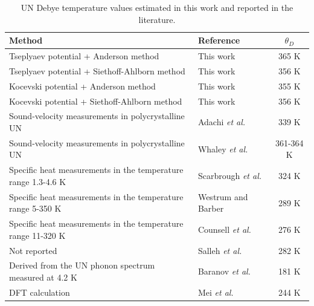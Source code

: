 \documentclass[preprint, 12pt]{elsarticle}
\begin{document}
\begin{table}[h!]
    \centering
    \footnotesize    
    \caption{UN Debye temperature values estimated in this work and reported in the literature.}
    \begin{tabular}{llc}
    \hline
    Method                                  & Reference & $\theta_{D}$ \\
    \hline
    Tseplyaev potential + Anderson method             & This work & 365 K \\
    Tseplyaev potential + Siethoff-Ahlborn method     & This work & 356 K \\ 
    Kocevski potential + Anderson method              & This work & 355 K \\
    Kocevski potential + Siethoff-Ahlborn method      & This work & 356 K \\
    \hline
    Sound-velocity measurements in polycrystalline UN             & Adachi \textit{et al.} \cite{Adachi2009}     & 339 K \\
    Sound-velocity measurements in polycrystalline UN             & Whaley \textit{et al.} \cite{Whaley1969}     & 361-364 K \\
    Specific heat measurements in the temperature range 1.3-4.6 K & Scarbrough \textit{et al.} \cite{Scarbrough1968} & 324 K \\
    Specific heat measurements in the temperature range 5-350 K   & Westrum and Barber \cite{Westrum1966}   & 289 K \\
    Specific heat measurements in the temperature range 11-320 K  & Counsell \textit{et al.} \cite{Counsell1964}     & 276 K \\
    Not reported                                          & Salleh \textit{et al.} \cite{Salleh1986}   & 282 K \\
    Derived from the UN phonon spectrum measured at 4.2 K & Baranov \textit{et al.} \cite{Baranov2013} & 181 K \\
    DFT calculation                                       & Mei \textit{et al.} \cite{Mei2013}         & 244 K \\
    \hline
    \end{tabular}
    \label{Tab:Debye}
\end{table}
\end{document}
